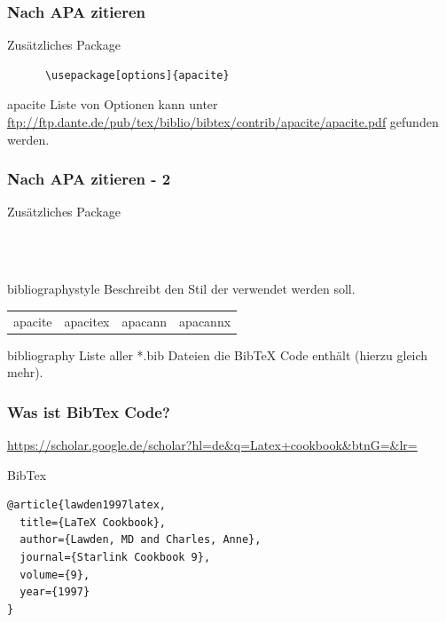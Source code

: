 \begin{frame}[fragile]
  \frametitle{Nach APA zitieren}

  \begin{block}{Zusätzliches Package}
    \begin{verbatim}
      \usepackage[options]{apacite}
    \end{verbatim}
  \end{block}
  \pause
  \begin{block}{apacite}
    Liste von Optionen kann unter \url{ftp://ftp.dante.de/pub/tex/biblio/bibtex/contrib/apacite/apacite.pdf} gefunden werden.
  
  \end{block}
\end{frame}
\begin{frame}[fragile]
  \frametitle{Nach APA zitieren - 2}

  \begin{block}{Zusätzliches Package}
    \begin{verbatim}
      
      
    \end{verbatim}
  \end{block}
  \pause
  \begin{block}{bibliographystyle}
    Beschreibt den Stil der verwendet werden soll.
    \begin{tabular}{c|c|c|c}
      apacite & apacitex & apacann & apacannx
    \end{tabular}
  \end{block}
  \pause
  \begin{block}{bibliography}
    Liste aller *.bib Dateien die BibTeX Code enthält (hierzu gleich mehr).
  \end{block}
\end{frame}

\begin{frame}[fragile]
  \frametitle{Was ist BibTex Code?}
  \pause
  \begin{example}
    \url{https://scholar.google.de/scholar?hl=de&q=Latex+cookbook&btnG=&lr=}
  \end{example}
  \pause
  \begin{block}{BibTex}
    \begin{verbatim}
@article{lawden1997latex,
  title={LaTeX Cookbook},
  author={Lawden, MD and Charles, Anne},
  journal={Starlink Cookbook 9},
  volume={9},
  year={1997}
}
    \end{verbatim}
  \end{block}
\end{frame}

